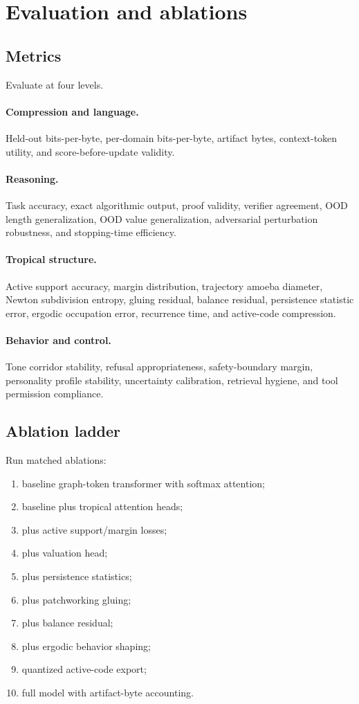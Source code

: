 \documentclass[11pt]{article}
\begin{document}
\section{Evaluation and ablations}

\subsection{Metrics}

Evaluate at four levels.

\paragraph{Compression and language.}  Held-out bits-per-byte, per-domain bits-per-byte, artifact bytes, context-token utility, and score-before-update validity.

\paragraph{Reasoning.}  Task accuracy, exact algorithmic output, proof validity, verifier agreement, OOD length generalization, OOD value generalization, adversarial perturbation robustness, and stopping-time efficiency.

\paragraph{Tropical structure.}  Active support accuracy, margin distribution, trajectory amoeba diameter, Newton subdivision entropy, gluing residual, balance residual, persistence statistic error, ergodic occupation error, recurrence time, and active-code compression.

\paragraph{Behavior and control.}  Tone corridor stability, refusal appropriateness, safety-boundary margin, personality profile stability, uncertainty calibration, retrieval hygiene, and tool permission compliance.

\subsection{Ablation ladder}

Run matched ablations:
\begin{enumerate}
\item baseline graph-token transformer with softmax attention;
\item baseline plus tropical attention heads;
\item plus active support/margin losses;
\item plus valuation head;
\item plus persistence statistics;
\item plus patchworking gluing;
\item plus balance residual;
\item plus ergodic behavior shaping;
\item quantized active-code export;
\item full model with artifact-byte accounting.
\end{enumerate}
\end{document}
